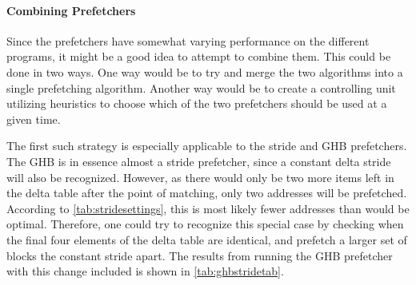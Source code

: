 \paragraph{Combining Prefetchers}
\label{par:prefcombo}
Since the prefetchers have somewhat varying performance on the
different programs, it might be a good idea to attempt to combine
them. This could be done in two ways. One way would be to try and
merge the two algorithms into a single prefetching algorithm. Another
way would be to create a controlling unit utilizing heuristics to
choose which of the two prefetchers should be used at a given time.

The first such strategy is especially applicable to the stride and GHB
prefetchers. The GHB is in essence almost a stride prefetcher, since a
constant delta stride will also be recognized. However, as there would
only be two more items left in the delta table after the point of
matching, only two addresses will be prefetched. According to
\autoref{tab:stridesettings}, this is most likely fewer addresses than
would be optimal. Therefore, one could try to recognize this special
case by checking when the final four elements of the delta table are
identical, and prefetch a larger set of blocks the constant stride
apart. The results from running the GHB prefetcher with this change
included is shown in \autoref{tab:ghbstridetab}.
